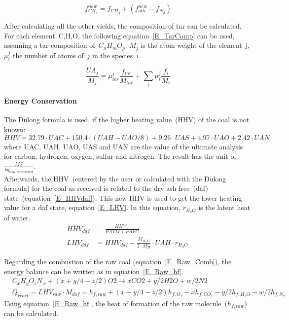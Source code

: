 \begin{equation}
 f_{CH_4}^{new} = f_{CH_4} + \left( f_{oth}^{new} - f_{N_2} \right)
\label{E_MethanNew}
\end{equation}

After calculating all the other yields, the composition of tar can be calculated. For each element~C,H,O, the following equation~\ref{E_TarComp} can be used, assuming a tar composition of~$C_nH_mO_p$. $M_j$ is the atom weight of the element~j, $\mu_i^j$ the number of atoms of~$j$ in the species~$i$.

\begin{equation}
\frac{UA_j}{M_j} = \mu_{tar}^j \frac{f_{tar}}{M_{tar}} + \sum_i \mu_i^{j} \frac{f_{i}}{M_{i}}
\label{E_TarComp}
\end{equation}


\paragraph{Energy Conservation}
The Dulong formula is used, if the higher heating value~(HHV) of the coal is not known:
\begin{equation}\label{E_Dulong}
 HHV = 32.79 \cdot UAC + 150.4 \cdot (UAH - UAO/8) + 9.26 \cdot UAS + 4.97 \cdot UAO + 2.42 \cdot UAN
\end{equation}
where UAC, UAH, UAO, UAS and UAN are the value of the ultimate analysis for carbon, hydrogen, oxygen, sulfur and nitrogen. The result has the unit of~$\frac{MJ}{kg_{coal, as recieved}}$.\\

Afterwards, the HHV~(entered by the user or calculated with the Dulong formula) for the coal as received is related to the dry ash-free~(daf) state~(equation~\ref{E_HHVdaf}). This new HHV is used to get the lower heating value for a daf state, equation~\ref{E_LHV}. In this equation, $r_{H_2O}$ is the latent heat of water.
\begin{align}
 HHV_{daf}&=\frac{HHV_{ar}}{PAVM+PAFC}
\label{E_HHVdaf}\\
LHV_{daf}&=HHV_{daf}-\frac{M_{H_2O}}{2 \cdot M_H} \cdot UAH \cdot r_{H_2O}\
\label{E_LHV}
\end{align}

Regarding the combustion of the raw coal (equation~\ref{E_Raw_Comb}), the energy balance can be written as in equation~\ref{E_Raw_hf}.
\begin{align}
 &C_xH_y O_z N_w + (x + y/4 - z/2) O2 \rightarrow x CO2 + y/2 H2O + w/2 N2
\label{E_Raw_Comb}\\
&Q_{react}=LHV_{raw}\cdot M_{daf} = h_{f,raw} + (x + y/4 - z/2) h_{f,O_2} -x h_{f,CO_2} -y/2
	h_{f,H_2O} - w/2 h_{f,N_2}
\label{E_Raw_hf}
\end{align}
Using equation~\ref{E_Raw_hf}, the heat of formation of the raw molecule~($h_{f,raw}$) can be calculated.\\

